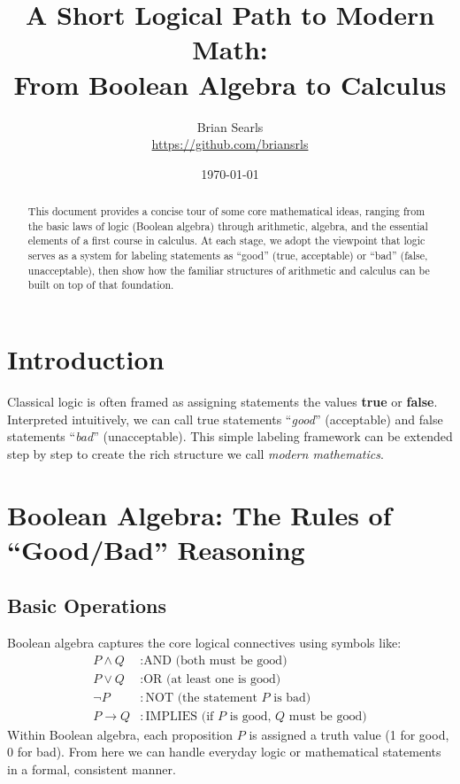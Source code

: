 \documentclass[12pt]{article}
\title{A Short Logical Path to Modern Math:\\
From Boolean Algebra to Calculus}
\author{Brian Searls\\\href{https://github.com/briansrls}{https://github.com/briansrls}}
\date{\today}
\begin{document}
\maketitle

\begin{abstract}
This document provides a concise tour of some core mathematical ideas,
ranging from the basic laws of logic (Boolean algebra) through arithmetic,
algebra, and the essential elements of a first course in calculus.
At each stage, we adopt the viewpoint that logic serves as a system for
labeling statements as ``good'' (true, acceptable) or ``bad'' (false,
unacceptable), then show how the familiar structures of arithmetic and
calculus can be built on top of that foundation.
\end{abstract}

\tableofcontents

\section{Introduction}
Classical logic is often framed as assigning statements the values
\textbf{true} or \textbf{false}. Interpreted intuitively, we can call
true statements ``\emph{good}'' (acceptable) and false statements
``\emph{bad}'' (unacceptable). This simple labeling framework can
be extended step by step to create the rich structure we call
\emph{modern mathematics}.

\section{Boolean Algebra: The Rules of ``Good/Bad'' Reasoning}

\subsection{Basic Operations}
\label{sec:boolean-ops}
Boolean algebra captures the core logical connectives using symbols
like:
\[
\begin{aligned}
P \wedge Q &: \text{AND (both must be good)} \\
P \vee Q &: \text{OR (at least one is good)} \\
\lnot P &: \text{NOT (the statement $P$ is bad)} \\
P \to Q &: \text{IMPLIES (if $P$ is good, $Q$ must be good)}
\end{aligned}
\]
Within Boolean algebra, each proposition $P$ is assigned a truth value
(1 for good, 0 for bad). From here we can handle everyday logic or
mathematical statements in a formal, consistent manner.
\end{document}
